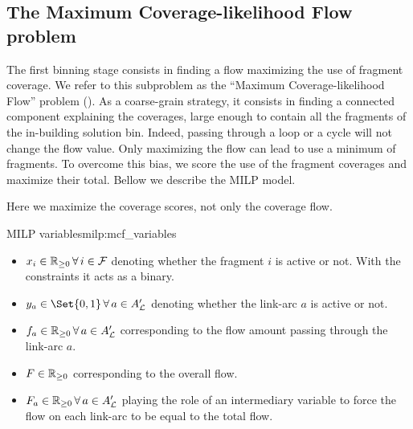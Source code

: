 \subsection{The Maximum Coverage-likelihood Flow problem \MCF{}}\label{meth:max_coverage_flow}

The first binning stage consists in finding a flow maximizing the use of fragment coverage.
We refer to this subproblem as the \enquote{Maximum Coverage-likelihood Flow} problem (\MCF{}).
As a coarse-grain strategy, it consists in finding a connected component explaining the coverages, large enough to contain all the fragments of the in-building solution bin.
Indeed, passing through a loop or a cycle will not change the flow value. Only maximizing the flow can lead to use a minimum of fragments.
To overcome this bias, we score the use of the fragment coverages and maximize their total.
Bellow we describe the MILP model.

\begin{newfeatbox}
    Here we maximize the coverage scores, not only the coverage flow.
\end{newfeatbox}

\begin{definition}{\MCF{} MILP variables}{milp:mcf_variables}
    \begin{itemize}
        \item \(x_i \in \Reals_{\geq 0} \, \forall i \in \Fragments{}\) denoting whether the fragment \(i\) is active or not. With the constraints it acts as a binary.
        \item \(y_a \in \Set{0, 1} \, \forall a \in A'_\Links{}\) denoting whether the link-arc \(a\) is active or not.
        \item \(f_a \in \Reals_{\geq 0} \, \forall a \in A'_\Links{}\) corresponding to the flow amount passing through the link-arc \(a\).
        \item \(F \in \mathbb{R}_{\geq 0}\) corresponding to the overall flow.
        \item \(F_a \in \Reals_{\geq 0} \, \forall a \in A'_\Links{}\) playing the role of an intermediary variable to force the flow on each link-arc to be equal to the total flow.
    \end{itemize}
\end{definition}


